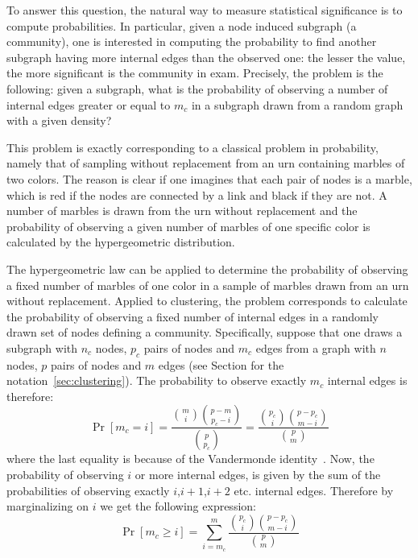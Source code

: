 To answer this question, the natural way to measure statistical significance is to compute probabilities. In particular, given a node induced subgraph (a community), one is interested in computing the probability to find another subgraph having more internal edges than the observed one: the lesser the value, the more significant is the community in exam.
Precisely, the problem is the following: given a subgraph, what is the probability of observing a number of internal edges greater or equal to $m_c$ in a subgraph drawn from a random graph with a given density?

This problem is exactly corresponding to a classical problem in probability, namely that of sampling without replacement from an urn containing marbles of two colors. The reason is clear if one imagines that each pair of nodes is a marble, which is red if the nodes are connected by a link and black if they are not. A number of marbles is drawn from the urn without replacement and the probability of observing a given number of marbles of one specific color is calculated by the hypergeometric distribution.

The hypergeometric law can be applied to determine the probability of observing a fixed number of marbles of one color in a sample of marbles drawn from an urn without replacement. Applied to clustering, the problem corresponds to calculate the probability of observing a fixed number of internal edges in a randomly drawn set of nodes defining a community.
Specifically, suppose that one draws a subgraph with $n_c$ nodes, $p_c$ pairs of nodes and $m_c$ edges from a graph with $n$ nodes, $p$ pairs of nodes and $m$ edges (see Section for the notation~\ref{sec:clustering}).
The probability to observe exactly $m_c$ internal edges is therefore:
\begin{equation}\label{eq:subgraph_probability}
\Pr[m_c = i] = \frac{\binom{m}{i}\binom{p-m}{p_c-i} }{\binom{p}{p_c}} = \frac{\binom{p_c}{i} \binom{p-p_c}{m-i}}{\binom{p}{m}}
\end{equation}
where the last equality is because of the Vandermonde identity~\cite{feller1968}.
Now, the probability of observing $i$ or more internal edges, is given by the sum of the probabilities of observing exactly $i$,$i+1$,$i+2$ etc. internal edges. Therefore by marginalizing on $i$ we get the following expression:
\begin{equation}\label{eq:subgraph_probability_marginalized}
\Pr[ m_c \geq i ] = \sum\limits_{i=m_c}^{m} \frac{\binom{p_c}{i} \binom{p-p_c}{m-i}}{\binom{p}{m}}
\end{equation}

